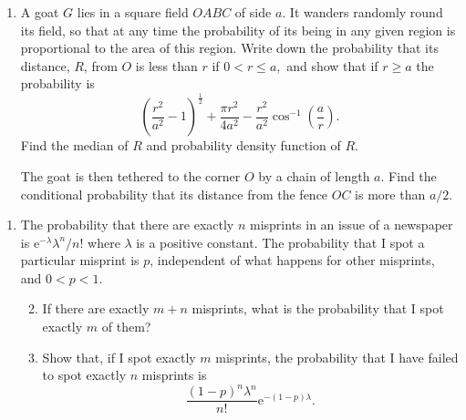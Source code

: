 \documentclass[a4, 11pt]{report}
\newlength{\qspace}
\newcounter{qnumber}
\newenvironment{question}%
 {\vspace{\qspace}
  \begin{enumerate}[\bfseries 1\quad][10]%
    \setcounter{enumi}{\value{qnumber}}%
    \item%
 }
{
  \end{enumerate}
  \filbreak
  \stepcounter{qnumber}
 }
\newenvironment{questionparts}[1][1]%
 {
  \begin{enumerate}[\bfseries (i)]%
    \setcounter{enumii}{#1}
    \addtocounter{enumii}{-1}
    \setlength{\itemsep}{5mm}
    \setlength{\parskip}{8pt}
 }
 {
  \end{enumerate}
 }
\begin{document}
\begin{question}
A goat $G$ lies in a square field $OABC$ of side $a$. It wanders
randomly round its field, so that at any time the probability of its
being in any given region is proportional to the area of this region.
Write down the probability that its distance, $R$, from $O$ is less
than $r$ if $0<r\leqslant a,$ and show that if $r\geqslant a$ the
probability is 
\[
\left(\frac{r^{2}}{a^{2}}-1\right)^{\frac{1}{2}}+\frac{\pi r^{2}}{4a^{2}}-\frac{r^{2}}{a^{2}}\cos^{-1}\left(\frac{a}{r}\right).
\]
Find the median of $R$ and probability density function of $R$. 


The goat is then tethered to the corner $O$ by a chain of length
$a$. Find the conditional probability that its distance from the
fence $OC$ is more than $a/2$.  
\end{question}

\begin{question}
The probability that there are exactly $n$ misprints in an issue
of a newspaper is $\mathrm{e}^{-\lambda}\lambda^{n}/n!$ where $\lambda$
is a positive constant. The probability that I spot a particular misprint
is $p$, independent of what happens for other misprints, and $0<p<1.$


\begin{questionparts}
	\item If there are exactly $m+n$ misprints, what
is the probability that I spot exactly $m$ of them?


\item Show that, if I spot exactly $m$ misprints, the probability
that I have failed to spot exactly $n$ misprints is 
\[
\frac{(1-p)^{n}\lambda^{n}}{n!}\mathrm{e}^{-(1-p)\lambda}.
\]
\end{questionparts}

\end{question}
\end{document}
